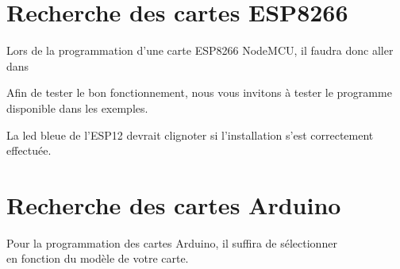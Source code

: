 \section{Recherche des cartes ESP8266}


Lors de la programmation d'une carte ESP8266 NodeMCU, il faudra donc aller dans \\



Afin de tester le bon fonctionnement, nous vous invitons à tester le programme  disponible dans les exemples.


La led bleue de l'ESP12 devrait clignoter si l'installation s'est correctement effectuée.

\section{Recherche des cartes Arduino}

Pour la programmation des cartes Arduino, il suffira de sélectionner \\
 en fonction du modèle de votre carte.

